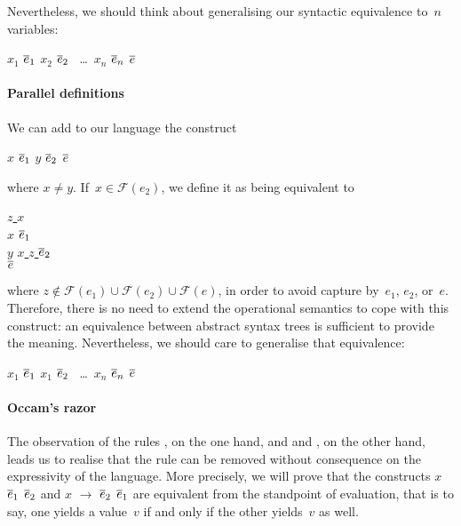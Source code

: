 Nevertheless, we should think about generalising our syntactic
equivalence to~\(n\) variables:
\begin{center}
\Xlet \Xrec $x_1$ \equal $\overline{e}_1$ \Xand $x_2$ \equal
$\overline{e}_2$ \Xand~\ldots~\Xand $x_n$ \equal $\overline{e}_n$ \Xin
$\overline{e}$
\end{center}

\paragraph{Parallel definitions}

We can add to our language the construct
\begin{center}
\Xlet $x$ \equal $\overline{e}_1$ \Xand $y$ \equal
$\overline{e}_2$ \Xin $\overline{e}$
\end{center}
where $x \neq y$. If~$x \in \mathcal{F}(e_2)$, we define it as being
equivalent to
\begin{tabbing}
\underline{\Xlet} \= \underline{$z$ \equal $x$ \Xin}\\
\> \Xlet $x$ \equal $\overline{e}_1$ \Xin\\
\> \Xlet $y$ \equal \underline{\Xlet $x$ \equal $z$ \Xin} $\overline{e}_2$\\
\Xin $\overline{e}$
\end{tabbing}
where
$z \not\in \mathcal{F}(e_1) \cup \mathcal{F}(e_2) \cup \mathcal{F}(e)$,
in order to avoid capture by~$e_1$, $e_2$, or~$e$. Therefore, there is
no need to extend the operational semantics to cope with this
construct: an equivalence between abstract syntax trees is sufficient
to provide the meaning. Nevertheless, we should care to generalise
that equivalence:
\begin{center}
\Xlet $x_1$ \equal $\overline{e}_1$ \Xand $x_1$ \equal
$\overline{e}_2$ \Xand~\ldots~\Xand $x_n$ \equal $\overline{e}_n$
\Xin $\overline{e}$
\end{center}

\paragraph{Occam's razor}

The observation of the rules , on the one hand, and
 and , on the other hand, leads us to
realise that the rule  can be removed without
consequence on the expressivity of the language. More precisely, we
will prove that the constructs  $x$ \equal{}
$\overline{e}_1$  $\overline{e}_2$ and \lpar{} $x$
$\rightarrow$ $\overline{e}_2$\rpar{} $\overline{e}_1$ are equivalent from the
standpoint of evaluation, that is to say, one yields a value~$v$ if
and only if the other yields~$v$ as well.

